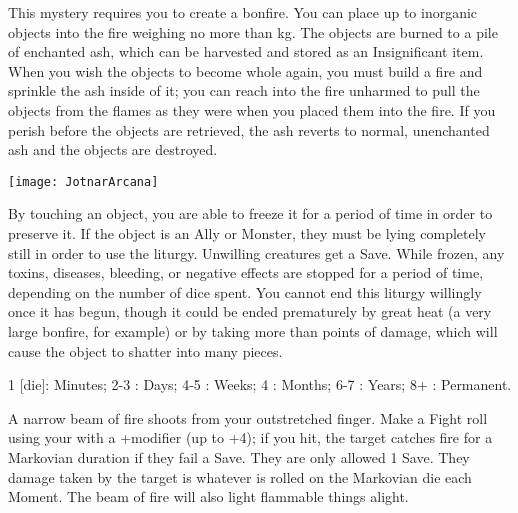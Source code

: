 \MYSTERY [
  Name = Incinerate,
  Link = arcana-mystery-incinerate,
  Paradigm = Elements,
  Save = N,
  Duration = See Below,
  Target = Close Target(s)
]

This mystery requires you to create a bonfire.  You can place up to \DICE inorganic objects into the fire weighing no more than \SUMDICE kg.  The objects are burned to a pile of enchanted ash, which can be harvested and stored as an Insignificant item.  When you wish the objects to become whole again, you must build a fire and sprinkle the ash inside of it; you can reach into the fire unharmed to pull the objects from the flames as they were when you placed them into the fire.  If you perish before the objects are retrieved, the ash reverts to normal, unenchanted ash and the objects are destroyed.


  \begin{center}
  \texttt{[image: JotnarArcana]}
  \end{center}



\MYSTERY [
  Name = Preserve,
  Link = arcana-mystery-preserve,
  Paradigm = Elements,
  Save = Y (neg.),
  Duration = varies,
  Target = Close Target(s)
]

By touching an object, you are able to freeze it for a period of time in order to preserve it.  If the object is an Ally or Monster, they must be lying completely still in order to use the liturgy.  Unwilling creatures get a Save.  While frozen, any toxins, diseases, bleeding, or negative effects are stopped for a period of time, depending on the number of dice spent.  You cannot end this liturgy willingly once it has begun, though it could be ended prematurely by great heat (a very large bonfire, for example) or by taking more than \SUMDICE points of damage, which will cause the object to shatter into many pieces.  

1 [die]: Minutes; 2-3 \DICE: Days; 4-5 \DICE: Weeks; 4 \DICE: Months; 6-7 \DICE: Years; 8+ \DICE: Permanent. 

\MYSTERY [
  Name = Ray of Fire,
  Link = arcana-mystery-ray-of-fire,
  Paradigm = Elements,
  Save = Y (neg.),
  Duration = Instant,
  Target = Nearby or Far-Away Target(s)
]

A narrow beam of fire shoots from your outstretched finger.  Make a Fight roll using your \FOC with a +\DICE modifier (up to +4); if you hit, the target catches fire for a Markovian duration if they fail a Save.  They are only allowed 1 Save.  They damage taken by the target is whatever is rolled on the Markovian die each Moment.  The beam of fire will also light flammable things alight.


